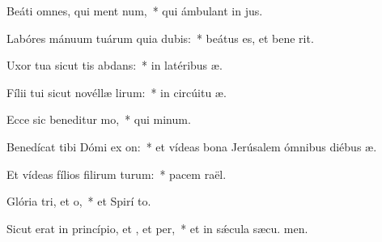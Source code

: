 \item Beáti omnes, qui ment num,~* qui ámbulant in  jus.
\item Labóres mánuum tuárum quia dubis:~* beátus es, et bene  rit.
\item Uxor tua sicut tis abdans:~* in latéribus  æ.
\item Fílii tui sicut novéllæ lirum:~* in circúitu  æ.
\item Ecce sic beneditur mo,~* qui  minum.
\item Benedícat tibi Dómi ex on:~* et vídeas bona Jerúsalem ómnibus diébus  æ.
\item Et vídeas fílios filirum turum:~* pacem  raël.
\item Glória tri, et o,~* et Spirí to.
\item Sicut erat in princípio, et , et per,~* et in sǽcula sæcu. men.
